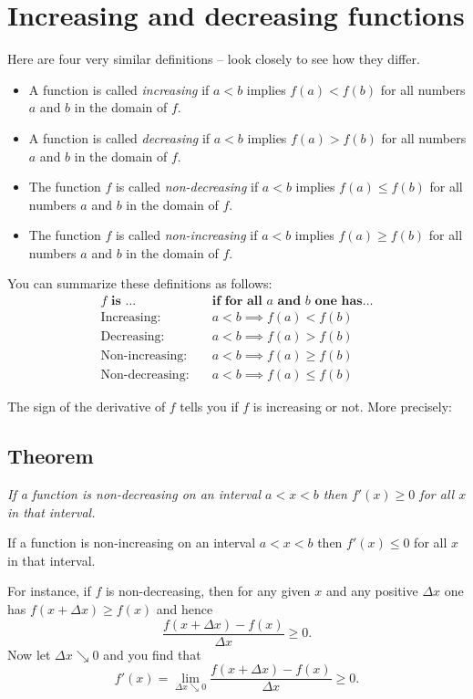 \section{Increasing and decreasing functions}
Here are four very similar definitions -- look closely to see how they differ.
\begin{itemize}
\item A function is called \emph{increasing} if $a<b$ implies $f(a)<f(b)$ for
  all numbers $a$ and $b$ in the domain of $f$.

\item A function is called \emph{decreasing} if $a<b$ implies $f(a)>f(b)$ for
  all numbers $a$ and $b$ in the domain of $f$.

\item The function $f $ is called \emph{non-decreasing} if $a<b$ implies
  $f(a)\leq f(b)$ for all numbers $a$ and $b$ in the domain of $f$.

\item The function $f $ is called \emph{non-increasing} if $a<b$ implies
  $f(a)\geq f(b)$ for all numbers $a$ and $b$ in the domain of $f$.
\end{itemize}
You can summarize these definitions as follows:
\begin{align*}
  \textbf{$f$ is \ldots}\quad\quad&
                           \textbf{if for all $a$ and $b$ one has\ldots}\\
  \text{Increasing:}\quad & a<b \implies f(a)<f(b) \\
  \text{Decreasing:}\quad & a<b \implies f(a)>f(b) \\
  \text{Non-increasing:}\quad & a<b \implies f(a)\geq f(b) \\
  \text{Non-decreasing:}\quad & a<b \implies f(a)\leq f(b)
\end{align*}

The sign of the derivative of $f$ tells you if $f$ is increasing or not.  More
precisely:

\subsection{Theorem}\label{thm:increasing-implies-deriv-pos}
\itshape If a function is non-decreasing on an interval $a<x<b$ then $f'(x)\geq
0$ for all $x$ in that interval.

If a function is non-increasing on an interval $a<x<b$ then $f'(x)\leq 0$ for
all $x$ in that interval.  \upshape

For instance, if $f$ is non-decreasing, then for any given $x$ and any positive
$\Delta x$ one has $f(x+ \Delta x)\geq f(x)$ and hence
\[
\frac{f(x+ \Delta x)-f(x)}{\Delta x} \geq 0.
\]
Now let $\Delta x\searrow 0$ and you find that
\[
f'(x) = \lim_{\Delta x\searrow0}\frac{f(x+ \Delta x)-f(x)}{\Delta x} \geq 0.
\]


